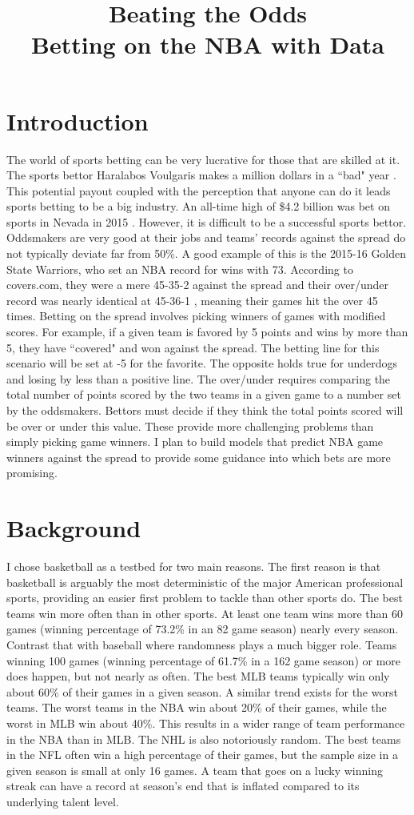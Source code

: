 \documentclass{article}
\title{Beating the Odds \\ Betting on the NBA with Data}
\date{\vspace{-5ex}}
\begin{document}
\maketitle
\section{Introduction}
The world of sports betting can be very lucrative for those that are skilled at it. The sports bettor Haralabos Voulgaris makes a million dollars in a ``bad" year \cite{silver}. This potential payout coupled with the perception that anyone can do it leads sports betting to be a big industry. An all-time high of \$4.2 billion was bet on sports in Nevada in 2015 \cite{espn}. However, it is difficult to be a successful sports bettor. Oddsmakers are very good at their jobs and teams' records against the spread do not typically deviate far from 50\%. A good example of this is the 2015-16 Golden State Warriors, who set an NBA record for wins with 73. According to covers.com, they were a mere 45-35-2 against the spread and their over/under record was nearly identical at 45-36-1 \cite{covers}, meaning their games hit the over 45 times. Betting on the spread involves picking winners of games with modified scores. For example, if a given team is favored by 5 points and wins by more than 5, they have ``covered" and won against the spread. The betting line for this scenario will be set at -5 for the favorite. The opposite holds true for underdogs and losing by less than a positive line. The over/under requires comparing the total number of points scored by the two teams in a given game to a number set by the oddsmakers. Bettors must decide if they think the total points scored will be over or under this value. These provide more challenging problems than simply picking game winners. I plan to build models that predict NBA game winners against the spread to provide some guidance into which bets are more promising.
\section{Background}
I chose basketball as a testbed for two main reasons. The first reason is that basketball is arguably the most deterministic of the major American professional sports, providing an easier first problem to tackle than other sports do. The best teams win more often than in other sports. At least one team wins more than 60 games (winning percentage of 73.2\% in an 82 game season) nearly every season. Contrast that with baseball where randomness plays a much bigger role. Teams winning 100 games (winning percentage of 61.7\% in a 162 game season) or more does happen, but not nearly as often. The best MLB teams typically win only about 60\% of their games in a given season. A similar trend exists for the worst teams. The worst teams in the NBA win about 20\% of their games, while the worst in MLB win about 40\%. This results in a wider range of team performance in the NBA than in MLB. The NHL is also notoriously random. The best teams in the NFL often win a high percentage of their games, but the sample size in a given season is small at only 16 games. A team that goes on a lucky winning streak can have a record at season's end that is inflated compared to its underlying talent level.
\end{document}
